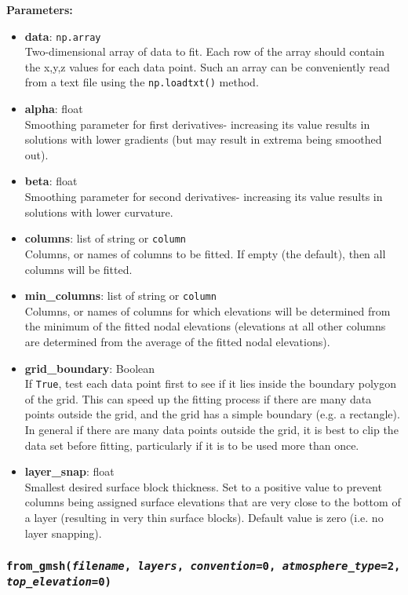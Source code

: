 \textbf{Parameters:}
\begin{itemize}
\item \textbf{data}: \texttt{np.array}\\
  Two-dimensional array of data to fit.  Each row of the array should contain the x,y,z values for each data point.  Such an array can be conveniently read from a text file using the \texttt{np.loadtxt()} method.
\item \textbf{alpha}: float\\
  Smoothing parameter for first derivatives- increasing its value results in solutions with lower gradients (but may result in extrema being smoothed out).
\item \textbf{beta}: float\\
  Smoothing parameter for second derivatives- increasing its value results in solutions with lower curvature.
\item \textbf{columns}: list of string or \texttt{column}\\
  Columns, or names of columns to be fitted.  If empty (the default), then all columns will be fitted.
\item \textbf{min\_columns}: list of string or \texttt{column}\\
  Columns, or names of columns for which elevations will be determined from the minimum of the fitted nodal elevations (elevations at all other columns are determined from the average of the fitted nodal elevations).
\item \textbf{grid\_boundary}: Boolean\\
  If \texttt{True}, test each data point first to see if it lies inside the boundary polygon of the grid.  This can speed up the fitting process if there are many data points outside the grid, and the grid has a simple boundary (e.g. a rectangle).  In general if there are many data points outside the grid, it is best to clip the data set before fitting, particularly if it is to be used more than once.
\item \textbf{layer\_snap}: float\\
  Smallest desired surface block thickness.  Set to a positive value to prevent columns being assigned surface elevations that are very close to the bottom of a layer (resulting in very thin surface blocks).  Default value is zero (i.e. no layer snapping).
\end{itemize}

\subsubsection{\texttt{from\_gmsh(\emph{filename}, \emph{layers}, \emph{convention}=0, \emph{atmosphere\_type}=2,\\
    \emph{top\_elevation}=0)}}

